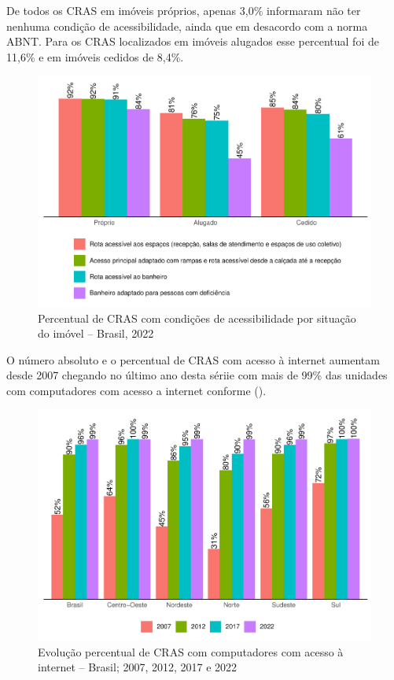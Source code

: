 \documentclass[
  brazilian]{report}
\begin{document}
De todos os CRAS em imóveis próprios, apenas 3,0\% informaram não ter
nenhuma condição de acessibilidade, ainda que em desacordo com a norma
ABNT. Para os CRAS localizados em imóveis alugados esse percentual foi
de 11,6\% e em imóveis cedidos de 8,4\%.

\begin{figure}
\includegraphics{Censo-SUAS-2022_files/figure-latex/CRAS-acessibilidade-situacao-1} \caption[Percentual de CRAS com condições de acessibilidade por situação do imóvel – Brasil, 2022]{Percentual de CRAS com condições de acessibilidade por situação do imóvel – Brasil, 2022}\label{fig:CRAS-acessibilidade-situacao}
\end{figure}

O número absoluto e o percentual de CRAS com acesso à internet aumentam
desde 2007 chegando no último ano desta sériie com mais de 99\% das
unidades com computadores com acesso a internet conforme
().

\begin{figure}
\includegraphics{Censo-SUAS-2022_files/figure-latex/CRAS-internet-percentual-1} \caption[Evolução percentual de CRAS com computadores com acesso à internet – Brasil]{Evolução percentual de CRAS com computadores com acesso à internet – Brasil; 2007, 2012, 2017 e 2022}\label{fig:CRAS-internet-percentual}
\end{figure}
\end{document}
